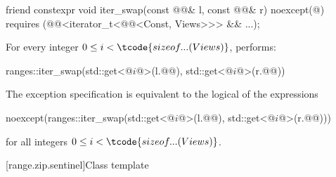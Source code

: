 %
\begin{itemdecl}
friend constexpr void iter_swap(const @@& l, const @@& r) noexcept(@\seebelow@)
  requires (@@<iterator_t<@@<Const, Views>>> && ...);
\end{itemdecl}

\begin{itemdescr}
\pnum
\effects
For every integer $0 \leq i < \tcode{sizeof...(Views)}$,
performs:
\begin{codeblock}
ranges::iter_swap(std::get<@$i$@>(l.@@), std::get<@$i$@>(r.@@))
\end{codeblock}

\pnum
\remarks
The exception specification is equivalent to
the logical  of the expressions
\begin{codeblock}
noexcept(ranges::iter_swap(std::get<@$i$@>(l.@@), std::get<@$i$@>(r.@@)))
\end{codeblock}
for all integers $0 \leq i < \tcode{sizeof...(Views)}$.
\end{itemdescr}

[range.zip.sentinel]{Class template }

